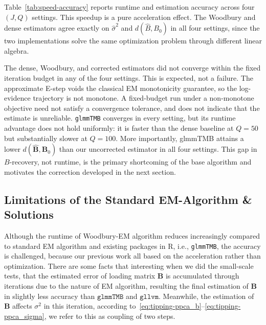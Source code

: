 Table~\ref{tab:speed-accuracy} reports runtime and estimation accuracy across four $(J,Q)$ settings. This speedup is a pure acceleration effect. The Woodbury and dense estimators agree exactly on $\hat\sigma^2$ and $d(\hat B,B_0)$ in all four settings, since the two implementations solve the same optimization problem through different linear algebra.

The dense, Woodbury, and corrected estimators did not converge within the fixed iteration budget in any of the four settings. This is expected, not a failure. The approximate E-step voids the classical EM monotonicity guarantee, so the log-evidence trajectory is not monotone. A fixed-budget run under a non-monotone objective need not satisfy a convergence tolerance, and does not indicate that the estimate is unreliable. \texttt{glmmTMB} converges in every setting, but its runtime advantage does not hold uniformly: it is faster than the dense baseline at $Q=50$ but substantially slower at $Q=100$. More importantly, glmmTMB attains a lower $d(\hat{\mathbf{B}}, \mathbf{B}_0)$ than our uncorrected estimator in all four settings. This gap in $B$-recovery, not runtime, is the primary shortcoming of the base algorithm and motivates the correction developed in the next section.

\subsection{Limitations of the Standard EM-Algorithm \& Solutions}

Although the runtime of Woodbury-EM algorithm reduces increasingly compared to standard EM algorithm and existing packages in R, i.e., \texttt{glmmTMB}, the accuracy is challenged, because our previous work all based on the acceleration rather than optimization. There are some facts that interesting when we did the small-scale tests, that the estimated error of loading matrix $\mathbf{B}$ is accumulated through iterations due to the nature of EM algorithm, resulting the final estimation of $\mathbf{B}$ in slightly less accuracy than $\texttt{glmmTMB}$ and $\texttt{gllvm}$. Meanwhile, the estimation of $\mathbf{B}$ affects $\sigma^{2}$ in this iteration, according to~\ref{eq:tipping-ppca_b}--\ref{eq:tipping-ppca_sigma}, we refer to this as coupling of two steps. 

